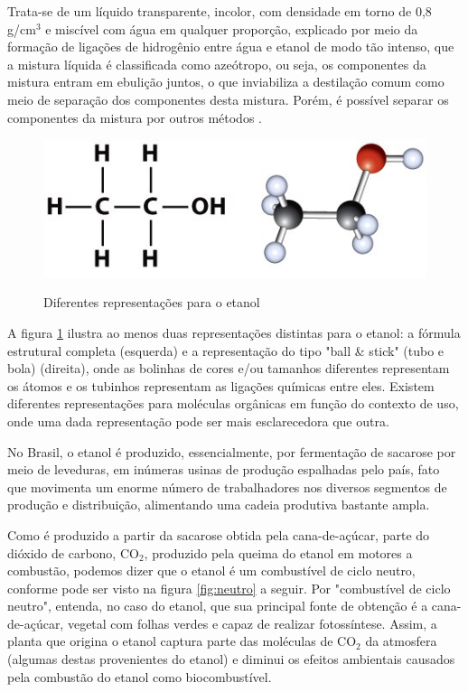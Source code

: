 Trata-se de um líquido transparente, incolor, com densidade em torno de 0,8 g/cm$^3$ e miscível com água em qualquer proporção, explicado por meio da formação de ligações de hidrogênio entre água e etanol de modo tão intenso, que a mistura líquida é classificada como azeótropo, ou seja, os componentes da mistura entram em ebulição juntos, o que inviabiliza a destilação comum como meio de separação dos componentes desta mistura. Porém, é possível separar os componentes da mistura por outros métodos \cite{trica}.

\begin{figure}[h]
	\centering
	\caption{Diferentes representações para o etanol}
	\vspace{0.5cm}
	\includegraphics[width=0.75\linewidth]{imagens/etanol2.jpeg}
	\label{fig:etanol2}
\end{figure}

A figura \ref{fig:etanol2} ilustra ao menos duas representações distintas para o etanol: a fórmula estrutural completa (esquerda) e a representação do tipo "ball \& stick" (tubo e bola) (direita), onde as bolinhas de cores e/ou tamanhos diferentes representam os átomos e os tubinhos representam as ligações químicas entre eles. Existem diferentes representações para moléculas orgânicas em função do contexto de uso, onde uma dada representação pode ser mais esclarecedora que outra.

No Brasil, o etanol é produzido, essencialmente, por fermentação de sacarose por meio de leveduras, em inúmeras usinas de produção espalhadas pelo país, fato que movimenta um enorme número de trabalhadores nos diversos segmentos de produção e distribuição, alimentando uma cadeia produtiva bastante ampla.

Como é produzido a partir da sacarose obtida pela cana-de-açúcar, parte do dióxido de carbono, CO$_2$, produzido pela queima do etanol em motores a combustão, podemos dizer que o etanol é um combustível de ciclo neutro, conforme pode ser visto na figura \ref{fig:neutro} a seguir. Por "combustível de ciclo neutro", entenda, no caso do etanol, que sua principal fonte de obtenção é a cana-de-açúcar, vegetal com folhas verdes e capaz de realizar fotossíntese. Assim, a planta que origina o etanol captura parte das moléculas de CO$_2$ da atmosfera (algumas destas provenientes do etanol) e diminui os efeitos ambientais causados pela combustão do etanol como biocombustível.

